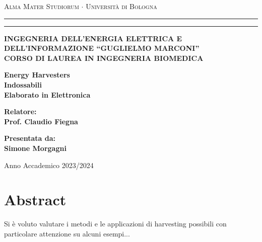 \documentclass[12pt,a4paper]{extreport}
\begin{document}
\textwidth=450pt
\topmargin=-50pt
\textheight=675pt

\pagecolor{back}
\color{letters}

\begin{titlepage}
    \topmargin=-50pt
    \begin{center}
    {{\Large{\textsc{Alma Mater Studiorum $\cdot$ Universit\`a di
    Bologna}}}} \rule[0.1cm]{15.8cm}{0.1mm}
    \rule[0.5cm]{15.8cm}{0.6mm}
    {{\bf INGEGNERIA DELL’ENERGIA ELETTRICA E DELL’INFORMAZIONE 
    “GUGLIELMO MARCONI”\\
    \small CORSO DI LAUREA IN INGEGNERIA BIOMEDICA}}
    \end{center}
    \vspace{15mm}
    \begin{center}
    {\LARGE{\bf Energy Harvesters}}\\
    \vspace{3mm}
    {\LARGE{\bf Indossabili}}\\
    \vspace{2cm}
    {\large{\bf Elaborato in Elettronica}}
    \end{center}
    \vspace{7cm}
    \par
    \noindent
    \begin{minipage}[t]{0.47\textwidth}
    {\large{\bf Relatore:\\
    Prof. Claudio Fiegna}}
    \end{minipage}
    \hfill
    \begin{minipage}[t]{0.47\textwidth}\raggedleft
    {\large{\bf Presentata da:\\
    Simone Morgagni}}
    \end{minipage}
    \vspace{20mm}
    \begin{center}
    {Anno Accademico 2023/2024}
    \end{center}
\end{titlepage}

\tableofcontents
{}

\chapter*{Abstract}
{Si \`e voluto valutare i metodi e le applicazioni di harvesting possibili con particolare attenzione su alcuni esempi...}






\cite{test}



\end{document}
